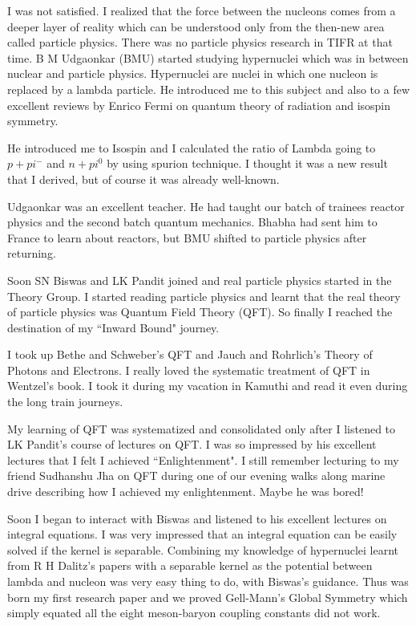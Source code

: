 I was not satisfied. I realized that the force between the nucleons 
comes from a deeper layer of reality which can be understood only from 
the then-new area called particle physics. There was no particle physics 
research in TIFR at that time. B M Udgaonkar (BMU) started studying 
hypernuclei which was in between nuclear and particle physics. 
Hypernuclei are nuclei in which one nucleon is replaced by a lambda 
particle. He introduced me to this subject and also to a few excellent 
reviews by Enrico Fermi on quantum theory of radiation and isospin 
symmetry.
 
He introduced me to Isospin and I calculated the ratio of Lambda going 
to $p + pi^-$ and $n + pi^0$ by using spurion technique. I thought it was a 
new result that I derived, but of course it was already well-known.
 
Udgaonkar was an excellent teacher. He had taught our batch of trainees 
reactor physics and the second batch quantum mechanics. Bhabha had sent 
him to France to learn about reactors, but BMU shifted to particle 
physics after returning.

Soon SN Biswas and LK Pandit joined and real particle physics started in 
the Theory Group. I started reading particle physics and learnt that the 
real theory of particle physics was Quantum Field Theory (QFT). So 
finally I reached the destination of my ``Inward Bound" journey.

I took up Bethe and Schweber's QFT and Jauch and Rohrlich's Theory of 
Photons and Electrons. I really loved the systematic treatment of QFT in 
Wentzel's book. I took it during my vacation in Kamuthi and read it even 
during the long train journeys.

My learning of QFT was systematized and consolidated only after I 
listened to LK Pandit's course of lectures on QFT. I was so impressed by 
his excellent lectures that I felt I achieved ``Enlightenment". I still 
remember lecturing to my friend Sudhanshu Jha on QFT during one of our 
evening walks along marine drive describing how I achieved my 
enlightenment. Maybe he was bored!
 
Soon I began to interact with Biswas and listened to his excellent 
lectures on integral equations. I was very impressed that an integral 
equation can be easily solved if the kernel is separable. Combining my 
knowledge of hypernuclei learnt from R H Dalitz's papers with a 
separable kernel as the potential between lambda and nucleon was very 
easy thing to do, with Biswas's guidance. Thus was born my first 
research paper and we proved Gell-Mann's Global Symmetry which simply 
equated all the eight meson-baryon coupling constants did not work.

